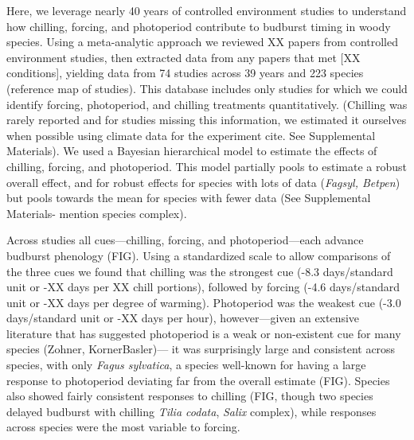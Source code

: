 \documentclass[11pt,letter]{article}
\begin{document}
\par Here, we leverage nearly 40 years of controlled environment studies to understand how chilling, forcing, and photoperiod contribute to budburst timing in woody species. Using a meta-analytic approach we reviewed XX papers from controlled environment studies, then extracted data from any papers that met [XX conditions], yielding data from 74 studies across 39 years and 223 species (reference map of studies).  This database includes only studies for which we could identify forcing, photoperiod, and chilling treatments quantitatively. (Chilling was rarely reported and for studies missing this information, we estimated it ourselves when possible using climate data for the experiment cite. See Supplemental Materials). We used a Bayesian hierarchical model to estimate the effects of chilling, forcing, and photoperiod. This model partially pools to estimate a robust overall effect, and for robust effects for species with lots of data (\emph{Fagsyl, Betpen}) but pools towards the mean for species with fewer data (See Supplemental Materials- mention species complex).\\

\par Across studies all cues---chilling, forcing, and photoperiod---each advance budburst phenology (FIG). Using a standardized scale to allow comparisons of the three cues we found that chilling was the strongest cue (-8.3 days/standard unit or -XX days per XX chill portions), followed by forcing (-4.6 days/standard unit or -XX days per degree of warming). Photoperiod was the weakest cue (-3.0 days/standard unit or -XX days per hour), however---given an extensive literature that has suggested photoperiod is a weak or non-existent cue for many species (Zohner, KornerBasler)--- it was surprisingly large and consistent across species, with only \emph{Fagus sylvatica}, a species well-known for having a large response to photoperiod deviating far from the overall estimate (FIG). Species also showed fairly consistent responses to chilling (FIG, though two species delayed budburst with chilling \emph{Tilia codata}, \emph{Salix} complex), while responses across species were the most variable to forcing. %
\end{document}
